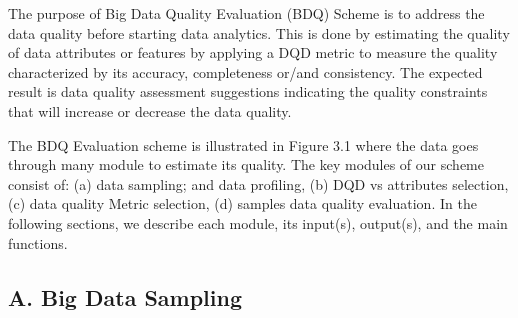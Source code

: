The purpose of Big Data Quality Evaluation (BDQ) Scheme is to address the data quality before starting data analytics.
This is done by estimating the quality of data attributes or features by applying a DQD metric to measure the quality characterized by its
accuracy, completeness or/and consistency. The expected result is data quality assessment suggestions indicating the quality 
constraints that will increase or decrease the data quality.

The BDQ Evaluation scheme is illustrated in Figure 3.1 where the data goes through many module to estimate its quality.
The key modules of our scheme consist of: (a) data sampling; and data profiling, (b) DQD vs attributes selection, 
(c) data quality Metric selection, (d) samples data quality evaluation. In the following sections, we describe each module, its input(s), output(s),
and the main functions.

\subsection{A. Big Data Sampling}
